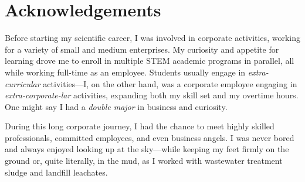 \chapter{Acknowledgements}\label{ch:acknowledgements}

\instructionsintroduction






Before starting my scientific career, I was involved in corporate activities, working for a variety of small and medium enterprises. My curiosity and appetite for learning drove me to enroll in multiple STEM academic programs in parallel, all while working full-time as an employee. Students usually engage in \textit{extra-curricular} activities—I, on the other hand, was a corporate employee engaging in \textit{extra-corporate-lar} activities, expanding both my skill set and my overtime hours. One might say I had a \textit{double major} in business and curiosity.

During this long corporate journey, I had the chance to meet highly skilled professionals, committed employees, and even business angels. I was never bored and always enjoyed looking up at the sky—while keeping my feet firmly on the ground or, quite literally, in the mud, as I worked with wastewater treatment sludge and landfill leachates.

